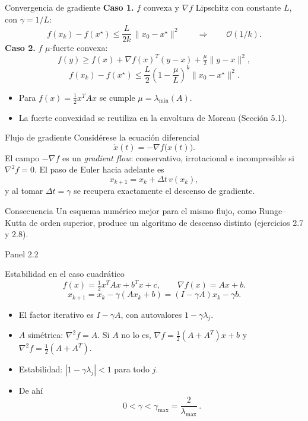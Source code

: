 \documentclass[10pt,aspectratio=169]{beamer}
\begin{document}
\begin{frame}{Convergencia de gradiente}
  \small
  \textbf{Caso 1.} $f$ convexa y $\nabla f$ Lipschitz con constante $L$, con $\gamma=1/L$:
  \[
    f(x_k)-f(x^\star)\le\frac{L}{2k}\,\|x_0-x^\star\|^2
    \qquad\Longrightarrow\qquad \mathcal{O}(1/k).
  \]
  \textbf{Caso 2.} $f$ $\mu$-fuerte convexa:
  \[
    f(y)\ge f(x)+\nabla f(x)^{T}(y-x)+\tfrac{\mu}{2}\|y-x\|^2,
  \]
  \[
    f(x_k)-f(x^\star)\le\frac{L}{2}
      \left(1-\frac{\mu}{L}\right)^{k}\|x_0-x^\star\|^2.
  \]
  \begin{itemize}
    \item Para $f(x)=\tfrac12 x^{T}Ax$ se cumple $\mu=\lambda_{\min}(A)$.
    \item La fuerte convexidad se reutiliza en la envoltura de Moreau (Sección 5.1).
  \end{itemize}
\end{frame}

\begin{frame}{Flujo de gradiente}
  \small
  Considérese la ecuación diferencial
  \[
    \dot x(t)=-\nabla f\big(x(t)\big).
  \]
  El campo $-\nabla f$ es un \emph{gradient flow}: conservativo, irrotacional e
  incompresible si $\nabla^2f=0$. El paso de Euler hacia adelante es
  \[
    x_{k+1}=x_k+\Delta t\,v(x_k),
  \]
  y al tomar $\Delta t=\gamma$ se recupera exactamente el descenso de gradiente.
  \begin{block}{Consecuencia}
    Un esquema numérico mejor para el mismo flujo, como Runge--Kutta de orden superior,
    produce un algoritmo de descenso distinto (ejercicios 2.7 y 2.8).
  \end{block}
  \vfill
  {\scriptsize\color{gray}Panel 2.2}
\end{frame}

\begin{frame}{Estabilidad en el caso cuadrático}
  \small
  \[
    f(x)=\tfrac12x^{T}Ax+b^{T}x+c,\qquad \nabla f(x)=Ax+b.
  \]
  \[
    x_{k+1}=x_k-\gamma(Ax_k+b)=(I-\gamma A)x_k-\gamma b.
  \]
  \begin{itemize}
    \item El factor iterativo es $I-\gamma A$, con autovalores $1-\gamma\lambda_j$.
    \item $A$ simétrica: $\nabla^2f=A$. Si $A$ no lo es,
      $\nabla f=\tfrac12(A+A^{T})x+b$ y $\nabla^2f=\tfrac12(A+A^{T})$.
    \item Estabilidad: $|1-\gamma\lambda_j|<1$ para todo $j$.
    \item De ahí
      \[
        \boxed{\,0<\gamma<\gamma_{\max}=\frac{2}{\lambda_{\max}}\,}.
      \]
  \end{itemize}
\end{frame}
\end{document}
